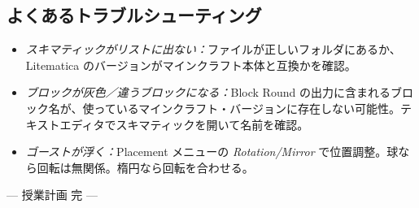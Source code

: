\documentclass[12pt,a4paper]{scrartcl}
\begin{document}
\subsection{よくあるトラブルシューティング}
\begin{itemize}[leftmargin=1.3em,itemsep=0.15em,topsep=0.3em,nosep]
  \item \emph{スキマティックがリストに出ない：}ファイルが正しいフォルダにあるか、Litematica のバージョンがマインクラフト本体と互換かを確認。
  \item \emph{ブロックが灰色／違うブロックになる：}Block Round の出力に含まれるブロック名が、使っているマインクラフト・バージョンに存在しない可能性。テキストエディタでスキマティックを開いて名前を確認。
  \item \emph{ゴーストが浮く：}Placement メニューの \emph{Rotation/Mirror} で位置調整。球なら回転は無関係。楕円なら回転を合わせる。
\end{itemize}

\vspace{2em}
\begin{center}
\color{muted}\small\sffamily
--- 授業計画 完 ---
\end{center}
\end{document}
